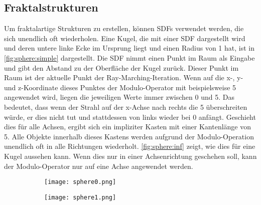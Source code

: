 \subsection{Fraktalstrukturen}
Um fraktalartige Strukturen zu erstellen, können SDFs verwendet werden, die sich unendlich oft wiederholen.
Eine Kugel, die mit einer SDF dargestellt wird und deren untere linke Ecke im Ursprung liegt und einen Radius von 1 hat, ist in \autoref{fig:sphere:simple} dargestellt.
Die SDF nimmt einen Punkt im Raum als Eingabe und gibt den Abstand zu der Oberfläche der Kugel zurück.
Dieser Punkt im Raum ist der aktuelle Punkt der Ray-Marching-Iteration.
Wenn auf die x-, y- und z-Koordinate dieses Punktes der Modulo-Operator mit beispielsweise 5 angewendet wird, liegen die jeweiligen Werte immer zwischen 0 und 5.
Das bedeutet, dass wenn der Strahl auf der x-Achse nach rechts die 5 überschreiten würde, er dies nicht tut und stattdessen von links wieder bei 0 anfängt.
Geschieht dies für alle Achsen, ergibt sich ein impliziter Kasten mit einer Kantenlänge von 5.
Alle Objekte innerhalb dieses Kastens werden aufgrund der Modulo-Operation unendlich oft in alle Richtungen wiederholt.
\autoref{fig:sphere:inf} zeigt, wie dies für eine Kugel aussehen kann.
Wenn dies nur in einer Achsenrichtung geschehen soll, kann der Modulo-Operator nur auf eine Achse angewendet werden.

\begin{figure}[!htbp]\centering
    \begin{subfigure}[t]{0.2\textwidth}
        \texttt{[image: sphere0.png]}
        \caption{}
        \label{fig:sphere:simple}
    \end{subfigure}
    \hfill
    \begin{subfigure}[t]{0.2\textwidth}
        \centering
        \texttt{[image: sphere1.png]}
        \caption{}
        \label{fig:sphere:inf}
    \end{subfigure}
    \caption{}
    \label{fig:sphere}
\end{figure}


